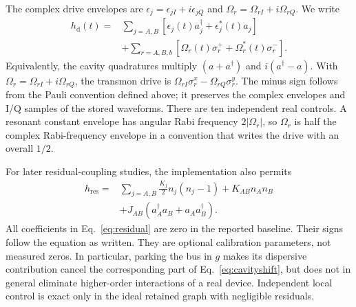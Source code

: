 \documentclass[aps,prb,reprint,amsmath,amssymb,nofootinbib]{revtex4-2}
\begin{document}
The complex drive envelopes are $\epsilon_j=\epsilon_{jI}+i\epsilon_{jQ}$
and $\Omega_r=\Omega_{rI}+i\Omega_{rQ}$. We write
\begin{align}
 h_{\mathrm d}(t)={}&\sum_{j=A,B}
       [\epsilon_j(t)a_j^\dagger+\epsilon_j^*(t)a_j]\nonumber\\
 &+\sum_{r=A,B,b}
       [\Omega_r(t)\sigma_r^++\Omega_r^*(t)\sigma_r^-].
 \label{eq:drives}
\end{align}
Equivalently, the cavity quadratures multiply $(a+a^\dagger)$ and
$i(a^\dagger-a)$. With $\Omega_r=\Omega_{rI}+i\Omega_{rQ}$, the transmon
drive is $\Omega_{rI}\sigma_r^x-\Omega_{rQ}\sigma_r^y$.
The minus sign follows from the Pauli convention defined above; it
preserves the complex envelopes and I/Q samples of the stored waveforms.
There are ten independent real controls. A resonant constant envelope
has angular Rabi frequency $2|\Omega_r|$, so $\Omega_r$ is half the
complex Rabi-frequency envelope in a convention that writes the drive
with an overall $1/2$.

For later residual-coupling studies, the implementation also permits
\begin{align}
 h_{\mathrm{res}}={}&\sum_{j=A,B}\frac{K_j}{2}n_j(n_j-1)
       +K_{AB}n_A n_B\nonumber\\
 &+J_{AB}(a_A^\dagger a_B+a_A a_B^\dagger).
 \label{eq:residual}
\end{align}
All coefficients in Eq.~\eqref{eq:residual} are zero in the reported
baseline. Their signs follow the equation as written. They are optional
calibration parameters, not measured zeros. In particular, parking the bus
in $g$ makes its dispersive contribution cancel the corresponding
part of Eq.~\eqref{eq:cavityshift}, but does not in general
eliminate higher-order interactions of a real device. Independent local
control is exact only in the ideal retained graph with negligible residuals.
\end{document}
